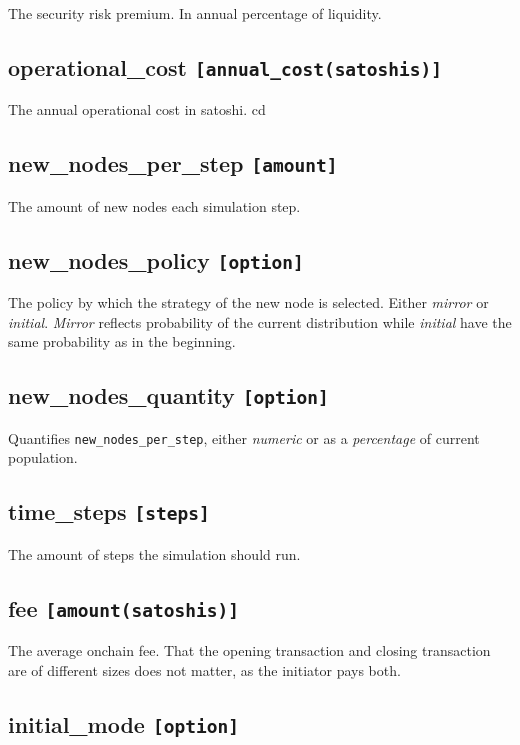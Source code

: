 The security risk premium. In annual percentage of liquidity.

\subsection*{operational\_cost \texttt{[annual\_cost(satoshis)]}}

The annual operational cost in satoshi.
cd
\subsection*{new\_nodes\_per\_step \texttt{[amount]}}

The amount of new nodes each simulation step. 

\subsection*{new\_nodes\_policy \texttt{[option]}}

The policy by which the strategy of the new node is selected. Either \textit{mirror} or \textit{initial}. \textit{Mirror} reflects probability of the current distribution while \textit{initial} have the same probability as in the beginning.

\subsection*{new\_nodes\_quantity \texttt{[option]}}

Quantifies \texttt{new\_nodes\_per\_step}, either \textit{numeric} or as a \textit{percentage} of current population.

\subsection*{time\_steps \texttt{[steps]}}

The amount of steps the simulation should run. 

\subsection*{fee \texttt{[amount(satoshis)]}}

The average onchain fee. That the opening transaction and closing transaction are of different sizes does not matter, as the initiator pays both.

\subsection*{initial\_mode \texttt{[option]}}

